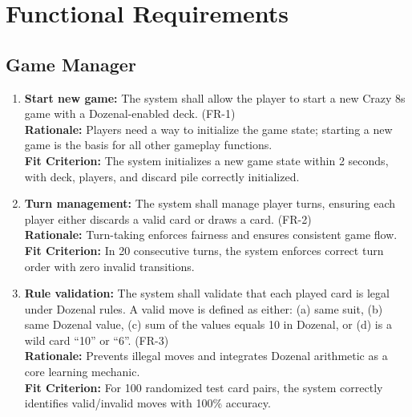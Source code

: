 \documentclass[12pt]{article}
\begin{document}
\section{Functional Requirements}

\subsection{Game Manager}

\begin{enumerate}
    \item \textbf{Start new game:} The system shall allow the player to start a new Crazy 8s game with a Dozenal-enabled deck. (FR-1) \\
    \textbf{Rationale:} Players need a way to initialize the game state; starting a new game is the basis for all other gameplay functions. \\
    \textbf{Fit Criterion:} The system initializes a new game state within 2 seconds, with deck, players, and discard pile correctly initialized.

    \item \textbf{Turn management:} The system shall manage player turns, ensuring each player either discards a valid card or draws a card. (FR-2) \\
    \textbf{Rationale:} Turn-taking enforces fairness and ensures consistent game flow. \\
    \textbf{Fit Criterion:} In 20 consecutive turns, the system enforces correct turn order with zero invalid transitions.

    \item \textbf{Rule validation:} The system shall validate that each played card is legal under Dozenal rules. A valid move is defined as either: 
    (a) same suit, (b) same Dozenal value, (c) sum of the values equals 10 in Dozenal, or (d) is a wild card ``10'' or ``6''. (FR-3) \\
    \textbf{Rationale:} Prevents illegal moves and integrates Dozenal arithmetic as a core learning mechanic. \\
    \textbf{Fit Criterion:} For 100 randomized test card pairs, the system correctly identifies valid/invalid moves with 100\% accuracy.


\end{enumerate}
\end{document}
